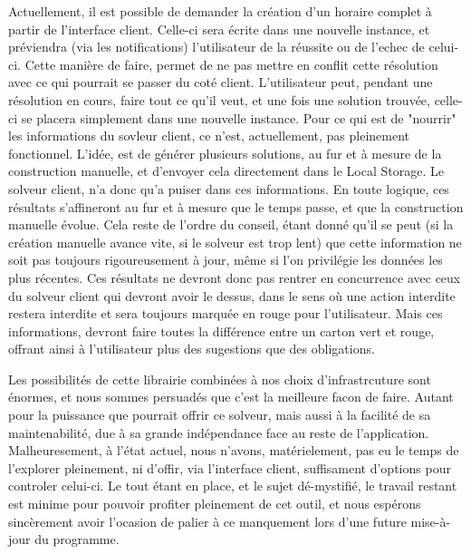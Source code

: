 \indent

Actuellement, il est possible de demander la création d'un horaire complet à partir de l'interface client. Celle-ci sera écrite dans une nouvelle instance, et préviendra (via les notifications) l'utilisateur de la réussite ou de l'echec de celui-ci.  Cette manière de faire, permet de ne pas mettre en conflit cette résolution avec ce qui pourrait se passer du coté client. L'utilisateur peut, pendant une résolution en cours, faire tout ce qu'il veut, et une fois une solution trouvée, celle-ci se placera simplement dans une nouvelle instance.
Pour ce qui est de "nourrir" les informations du sovleur client, ce n'est, actuellement, pas pleinement fonctionnel. L'idée, est de générer plusieurs solutions, 
au fur et à mesure de la construction manuelle, et d'envoyer cela directement dans le Local Storage. Le solveur client, n'a donc qu'a puiser dans ces informations.
En toute logique, ces résultats s'affineront au fur et à mesure que le temps passe, et que la construction manuelle évolue. Cela reste de l'ordre du conseil, étant donné qu'il se peut (si la création manuelle avance vite, si le solveur est trop lent) que cette information ne soit pas toujours rigoureusement à jour, même si l'on privilégie les données les plus récentes.  Ces résultats ne devront donc pas rentrer en concurrence avec ceux du solveur client qui devront avoir le dessus, dans le sens où une action interdite restera interdite et sera toujours marquée en rouge pour l'utilisateur. 
Mais ces informations, devront faire toutes la différence entre un carton vert et rouge, offrant ainsi à l'utilisateur plus des sugestions que des obligations. 

Les possibilités de cette librairie combinées à nos choix d'infrastrcuture sont énormes, et nous sommes persuadés que c'est la meilleure facon de faire. Autant pour la puissance que pourrait offrir ce solveur, mais aussi à la facilité de sa maintenabilité, due à sa grande indépendance face au reste de l'application.
Malheuresement, à l'état actuel, nous n'avons, matérielement, pas eu le temps de l'explorer pleinement, ni d'offir, via l'interface client, suffisament d'options pour controler celui-ci.
Le tout étant en place, et le sujet dé-mystifié, le travail restant est minime pour pouvoir profiter pleinement de cet outil, et nous espérons sincèrement avoir l'ocasion de palier à ce manquement lors d'une future mise-à-jour du programme.
